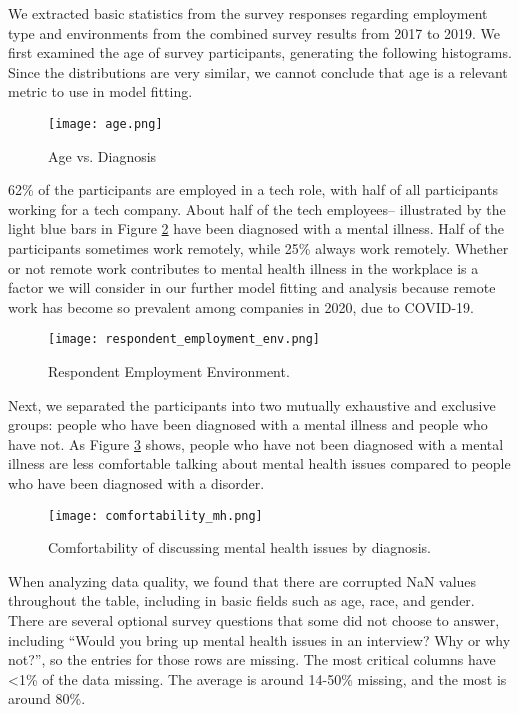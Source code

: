 \documentclass[times, twocolumn]{article}
\begin{document}
We extracted basic statistics from the survey responses regarding employment type
and environments from the combined survey results from 2017 to 2019. We first
examined the age of survey participants, generating the following histograms.
Since the distributions are very similar, we cannot conclude that age is a
relevant metric to use in model fitting.


\begin{figure}[h]
    \centering
    \texttt{[image: age.png]}
    \caption{Age vs. Diagnosis}
    \label{fig:age}
\end{figure}

62\% of the participants are employed in a tech role, with half of all participants
working for a tech company. About half of the tech employees-- illustrated by the
light blue bars in Figure \ref{fig:respondent} have been diagnosed with a mental
illness. Half of the participants sometimes work remotely, while 25\% always work
remotely. Whether or not remote work contributes to mental health illness in the
workplace is a factor we will consider in our further model fitting and analysis
because remote work has become so prevalent among companies in 2020, due to COVID-19.

\begin{figure}
    \centering
    \texttt{[image: respondent\_employment\_env.png]}
    \caption{Respondent Employment Environment.}
    \label{fig:respondent}
\end{figure}

Next, we separated the participants into two mutually exhaustive and exclusive
groups: people who have been diagnosed with a mental illness and people who have
not. As Figure \ref{fig:comfortability_mh} shows, people who have not been diagnosed
with a mental illness are less comfortable talking about mental health issues
compared to people who have been diagnosed with a disorder.


\begin{figure}
    \centering
    \texttt{[image: comfortability\_mh.png]}
    \caption{Comfortability of discussing mental health issues by diagnosis.}
    \label{fig:comfortability_mh}
\end{figure}

When analyzing data quality, we found that there are corrupted NaN values
throughout the table, including in basic fields such as age, race, and gender.
 There are several optional survey questions that some did not choose to answer,
 including “Would you bring up mental health issues in an interview? Why or why
 not?”, so the entries for those rows are missing. The most critical columns have
 <1\% of the data missing. The average is around 14-50\% missing, and the most
 is around 80\%.
\end{document}
